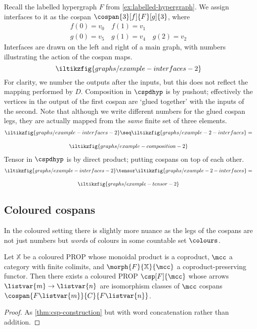 \begin{example}
    Recall the labelled hypergraph \(F\) from \cref{ex:labelled-hypergraph}.
    We assign interfaces to it as the cospan \(\cospan{3}[f]{F}[g]{3}\), where
    \begin{gather*}
        f(0) = v_0 \quad f(1) = v_1 \\
        g(0) = v_5 \quad g(1) = v_4 \quad g(2) = v_2
    \end{gather*}
    Interfaces are drawn on the left and right of a main graph, with numbers
    illustrating the action of the cospan maps.
    \[
        \iltikzfig{graphs/example-interfaces-2}
    \]
    For clarity, we number the outputs after the inputs, but this does not
    reflect the mapping performed by \(D\).
    Composition in \(\cspdhyp\) is by pushout; effectively the vertices in the
    output of the first cospan are `glued together' with the inputs of the
    second.
    Note that although we write different numbers for the glued cospan legs,
    they are actually mapped from the \emph{same} finite set of three elements.
    \begin{gather*}
        \iltikzfig{graphs/example-interfaces-2}
        \seq
        \iltikzfig{graphs/example-2-interfaces}
        =\\[1em]
        \iltikzfig{graphs/example-composition-2}
    \end{gather*}
    Tensor in \(\cspdhyp\) is by direct product; putting cospans on top of each
    other.
    \begin{gather*}
        \iltikzfig{graphs/example-interfaces-2}
        \tensor
        \iltikzfig{graphs/example-2-interfaces}
        =\\[1em]
        \iltikzfig{graphs/example-tensor-2}
    \end{gather*}
\end{example}

\subsection{Coloured cospans}

In the coloured setting there is slightly more nuance as the legs of the
cospans are not just numbers but \emph{words} of colours in some countable set
\(\colours\).

\begin{theorem}\label{thm:coloured-csp-construction}
    Let \(\mathbb{X}\) be a coloured PROP whose monoidal product is a coproduct,
    \(\mcc\) a category with finite colimits, and \(
    \morph{F}{\mathbb{X}}{\mcc}
    \) a coproduct-preserving functor.
    Then there exists a coloured PROP \(\csp[F]{\mcc}\) whose arrows
    \(\listvar{m} \to \listvar{n}\) are isomorphism classes of \(\mcc\)
    cospans \(\cospan{F\listvar{m}}{C}{F\listvar{n}}\).
\end{theorem}
\begin{proof}
    As \cref{thm:csp-construction} but with word concatenation rather
    than addition.
\end{proof}

